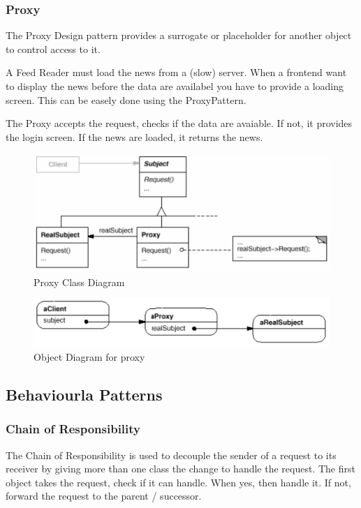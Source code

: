 \documentclass[11pt]{article}
\begin{document}
\subsubsection{Proxy}
\label{sec:orgb4f6d61}
The Proxy Design pattern provides a surrogate or placeholder for another object to control access to it.

A Feed Reader must load the news from a (slow) server.
When a frontend want to display the news before the data are availabel you have to provide a loading screen.
This can be easely done using the ProxyPattern.

The Proxy accepts the request, checks if the data are avaiable.
If not, it provides the login screen.
If the news are loaded, it returns the news.


\begin{figure}[htbp]
\centering
\includegraphics[width=.9\linewidth]{img/proxy.png}
\caption{\label{fig:proxy-class-diagram}Proxy Class Diagram}
\end{figure}


\begin{figure}[htbp]
\centering
\includegraphics[width=.9\linewidth]{img/proxy_object_diagram.png}
\caption{\label{fig:object-diagram-for-proxy}Object Diagram for proxy}
\end{figure}

\subsection{Behaviourla Patterns}
\label{sec:orgd673747}
\subsubsection{Chain of Responsibility}
\label{sec:org9869e89}
The Chain of Responsibility is used to decouple the sender of a request to its receiver by giving more than one class the change to handle the request.
The first object takes the request, check if it can handle.
When yes, then handle it.
If not, forward the request to the parent / successor.
\end{document}
